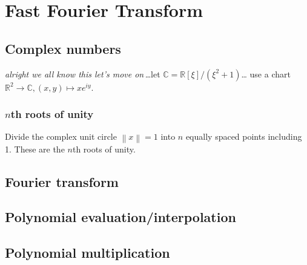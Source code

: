 \chapter{Fast Fourier Transform}
\section{Complex numbers}
\emph{alright we all know this let's move on\,\ldots}let \(\mathbb{C} = \mathbb{R}[\xi]/\left(\xi^2+1\right)\)\ldots%
use a chart \(\mathbb{R}^2\to\mathbb{C}, \left(x,y\right)\mapsto xe^{iy}\).

\subsection{\(n\)th roots of unity}
Divide the complex unit circle \(\left\|x\right\| = 1\) into \(n\) equally spaced points including 1. These are the \(n\)th roots of unity.
\section{Fourier transform}
\section{Polynomial evaluation/interpolation}
\section{Polynomial multiplication}